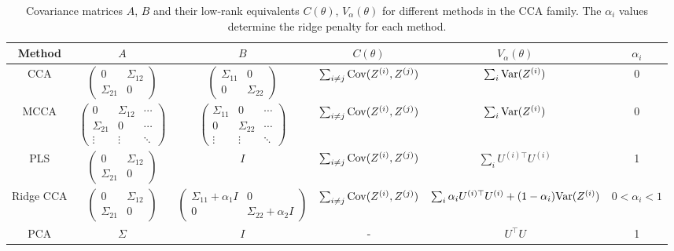 \begin{table}[h]
\centering
\small
\begin{tabular}{|c|c|c|c|c|c|}
\hline
Method & $A$ & $B$ & $C(\theta)$ & $V_\alpha(\theta)$ & $\alpha_i$ \\
\hline
CCA & $\begin{pmatrix}
0 & \Sigma_{12} \\
\Sigma_{21} & 0
\end{pmatrix}$ & $\begin{pmatrix}
\Sigma_{11} & 0 \\
0 & \Sigma_{22}
\end{pmatrix}$ & $\sum_{i \neq j} \mathrm{Cov}(Z^{(i)}, Z^{(j)})$ & $\sum_{i} \mathrm{Var}(Z^{(i)})$ & 0 \\
\hline
MCCA & $\begin{pmatrix}
0 & \Sigma_{12} & \cdots \\
\Sigma_{21} & 0 & \cdots \\
\vdots & \vdots & \ddots
\end{pmatrix}$ & $\begin{pmatrix}
\Sigma_{11} & 0 & \cdots \\
0 & \Sigma_{22} & \cdots \\
\vdots & \vdots & \ddots
\end{pmatrix}$ & $\sum_{i \neq j} \mathrm{Cov}(Z^{(i)}, Z^{(j)})$ & $\sum_{i} \mathrm{Var}(Z^{(i)})$ & 0 \\
\hline
PLS & $\begin{pmatrix}
0 & \Sigma_{12} \\
\Sigma_{21} & 0
\end{pmatrix}$ & $I$ & $\sum_{i \neq j} \mathrm{Cov}(Z^{(i)}, Z^{(j)})$ & $\sum_{i} U^{(i)\top} U^{(i)}$ & 1 \\
\hline
Ridge CCA & $\begin{pmatrix}
0 & \Sigma_{12} \\
\Sigma_{21} & 0
\end{pmatrix}$ & $\begin{pmatrix}
\Sigma_{11} + \alpha_1 I & 0 \\
0 & \Sigma_{22} + \alpha_2 I
\end{pmatrix}$ & $\sum_{i \neq j} \mathrm{Cov}(Z^{(i)}, Z^{(j)})$ & $\sum_i \alpha_i U^{(i)\top} U^{(i)} + (1 - \alpha_i) \mathrm{Var}(Z^{(i)})$ & $0 < \alpha_i < 1$ \\
\hline
PCA & $\Sigma$ & $I$ & - & $U^\top U$ & 1 \\
\hline
\end{tabular}
\caption{Covariance matrices $A$, $B$ and their low-rank equivalents $C(\theta)$, $V_\alpha(\theta)$ for different methods in the CCA family. The $\alpha_i$ values determine the ridge penalty for each method.}
\label{tab:covariance-matrices}
\end{table}
